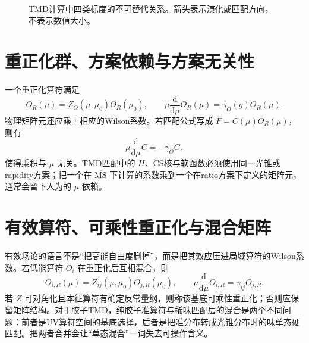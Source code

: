 \documentclass[UTF8,12pt,a4paper,twoside,openany]{ctexbook}
\newcommand{\MSbar}{\overline{\mathrm{MS}}}
\newcommand{\dd}{\mathrm{d}}
\begin{document}
\begin{figure}[htbp]
\centering
{}
\caption{TMD计算中四类标度的不可替代关系。箭头表示演化或匹配方向，不表示数值大小。}
\label{fig:toolbox-scales}
\end{figure}

\section{重正化群、方案依赖与方案无关性}

一个重正化算符满足
\begin{equation}
  O_R(\mu)=Z_O(\mu,\mu_0)O_R(\mu_0),
  \qquad
  \mu\frac{\dd}{\dd\mu}O_R(\mu)=\gamma_O(g)O_R(\mu).
  \label{eq:toolbox-rge}
\end{equation}
物理矩阵元还应乘上相应的Wilson系数。若匹配公式写成 \(F=C(\mu)O_R(\mu)\)，则有
\begin{equation}
  \mu\frac{\dd}{\dd\mu}C=-\gamma_O C,
  \label{eq:toolbox-wilsonrge}
\end{equation}
使得乘积与 \(\mu\) 无关。TMD匹配中的 \(H\)、CS核与软函数必须使用同一光锥或rapidity方案；把一个在 \(\MSbar\) 下计算的系数乘到一个在ratio方案下定义的矩阵元，通常会留下人为的 \(\mu\) 依赖。

\section{有效算符、可乘性重正化与混合矩阵}

有效场论的语言不是“把高能自由度删掉”，而是把其效应压进局域算符的Wilson系数。若低能算符 \(O_i\) 在重正化后互相混合，则
\begin{equation}
  O_{i,R}(\mu)=Z_{ij}(\mu,\mu_0)O_{j,R}(\mu_0),
  \qquad
  \mu\frac{\dd}{\dd\mu}O_{i,R}=\gamma_{ij}O_{j,R}.
  \label{eq:toolbox-mixing}
\end{equation}
若 \(Z\) 可对角化且本征算符有确定反常量纲，则称该基底可乘性重正化；否则应保留矩阵结构。对于胶子TMD，纯胶子准算符与稀味匹配层的混合是两个不同问题：前者是UV算符空间的基底选择，后者是把准分布转成光锥分布时的味单态硬匹配。把两者合并会让“单态混合”一词失去可操作含义。
\end{document}
